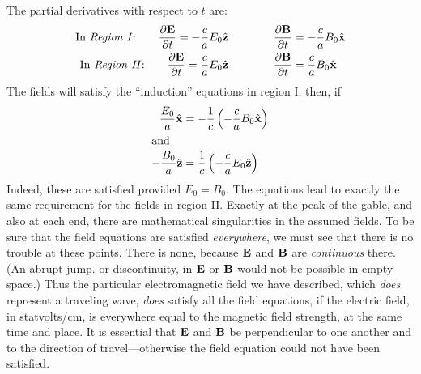 The partial derivatives with respect to $t$ are:
\begin{align}
\begin{split}
  \text{In \emph{Region I}:}  \qquad 
             \frac{\partial\mathbf{E}}{\partial t} = -\frac{c}{a}E_0\hat{\mathbf{z}}
           \qquad & \qquad \frac{\partial\mathbf{B}}{\partial t} = -\frac{c}{a}B_0\hat{\mathbf{x}} \\
  \text{In \emph{Region II}:}  \qquad 
             \frac{\partial\mathbf{E}}{\partial t} = \frac{c}{a}E_0\hat{\mathbf{z}}
           \qquad & \qquad \frac{\partial\mathbf{B}}{\partial t} = \frac{c}{a}B_0\hat{\mathbf{x}} 
\end{split}
\end{align}
The fields will satisfy the ``induction'' equations in region I, then, if
\begin{align}
\begin{split}
  \frac{E_0}{a}\hat{\mathbf{x}} &= -\frac{1}{c}\left(-\frac{c}{a}B_0\hat{\mathbf{x}}\right) \\
\intertext{and}
  -\frac{B_0}{a}\hat{\mathbf{z}} &= \frac{1}{c}\left(-\frac{c}{a}E_0\hat{\mathbf{z}}\right) 
\end{split}
\end{align}
Indeed, these are satisfied provided $E_0 = B_0$. The equations lead
to exactly the same requirement for the fields in region II. Exactly
at the peak of the gable, and also at each end, there are mathematical
singularities in the assumed fields. To be sure that the field equations
are satisfied \emph{everywhere}, we must see that there is no trouble at these
points. There is none, because $\mathbf{E}$ and $\mathbf{B}$ are \emph{continuous} there. (An
abrupt jump. or discontinuity, in $\mathbf{E}$ or $\mathbf{B}$ would not be possible in
empty space.) Thus the particular electromagnetic field we have
described, which \emph{does} represent a traveling wave, \emph{does} satisfy all the
field equations, if the electric field, in statvolts/cm, is everywhere
equal to the magnetic field strength, at the same time and place. It is
essential that $\mathbf{E}$ and $\mathbf{B}$ be perpendicular to one another and to the
direction of travel---otherwise the field equation could not have been
satisfied.


